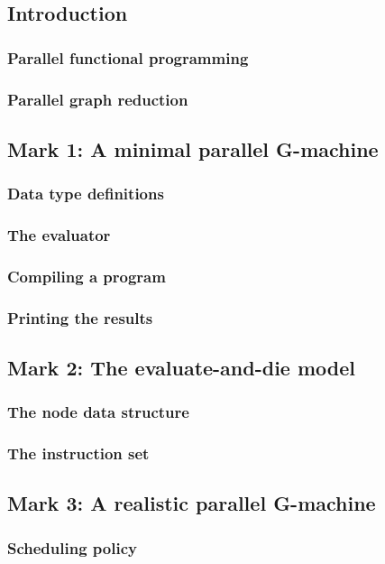 \documentclass{jarticle}
\begin{document}
\subsection{Introduction}
\subsubsection{Parallel functional programming}
\subsubsection{Parallel graph reduction}

\subsection{Mark 1: A minimal parallel G-machine}
\subsubsection{Data type definitions}
\subsubsection{The evaluator}
\subsubsection{Compiling a program}
\subsubsection{Printing the results}

\subsection{Mark 2: The evaluate-and-die model}
\subsubsection{The node data structure}
\subsubsection{The instruction set}

\subsection{Mark 3: A realistic parallel G-machine}
\subsubsection{Scheduling policy}
\end{document}
